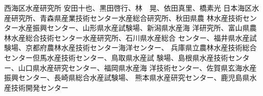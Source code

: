 {西海区水産研究所}%
{安田十也、黒田啓行、林　晃、依田真里、橋素光}%
{日本海区水産研究所、青森県産業技術センター水産総合研究所、秋田県農
林水産技術センター水産振興センター、山形県水産試験場、新潟県水産海
洋研究所、富山県農林水産総合技術センター水産研究所、石川県水産総合
センター、福井県水産試験場、京都府農林水産技術センター海洋センター、
兵庫県立農林水産技術総合センター但馬水産技術センター、鳥取県水産試
験場、島根県水産技術センター、山口県水産研究センター、福岡県水産海
洋技術センター、佐賀県玄海水産振興センター、長崎県総合水産試験場、
熊本県水産研究センター、鹿児島県水産技術開発センター
}%

